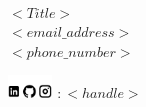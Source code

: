 \documentclass{article}
\begin{document}
\vspace*{\fill}

{\bf\Large
  \\
  \noindent $<Title>$\\
  \noindent $<email\_address>$\\
  \noindent $<phone\_number>$

  \noindent \includegraphics[height=0.6cm]{logos_linkedin_github_instagram_icons.png}
  :\,$<handle>$
}
\end{document}
